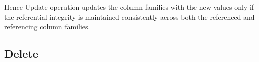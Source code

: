 Hence Update operation updates the column families with the new values only if
the referential integrity is maintained consistently across both the referenced
and referencing column families.


 \subsection{Delete} %

